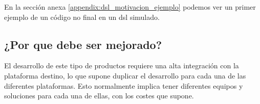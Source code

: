 En la sección anexa \ref{appendix:dsl_motivacion_ejemplo} podemos ver un primer ejemplo de un código no final en un \gls{dsl} simulado.


\subsection{¿Por que debe ser mejorado?}

El desarrollo de este tipo de productos requiere una alta integración con la plataforma destino, lo que supone duplicar el desarrollo para cada una de las diferentes plataformas.
Esto normalmente implica tener diferentes equipos y soluciones para cada una de ellas, con los costes que supone.
